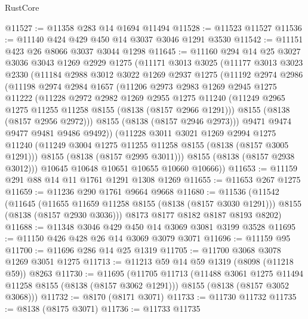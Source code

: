 \begin{lexlean}{RustCore}
\begin{coremodule}
@11527 := @11358 @283 @14 @1694 @11494
@11528 := @11523 @11527
@11536 := @11140 @424 @429 @450 @14 @3037 @3046 @1291 @3530
@11542 := @11151 @423 @26 @8066 @3037 @3044 @1298
@11645 := @11160
    @294
    @14
    @25
    @3027
    @3036
    @3043
    @1269
    @2929
    @1275
    (@11171
      @3013
      @3025
      (@11177
        @3013
        @3023
        @2330
        (@11184
          @2988
          @3012
          @3022
          @1269
          @2937
          @1275
          (@11192
            @2974
            @2986
            (@11198
              @2974
              @2984
              @1657
              (@11206
                @2973
                @2983
                @1269
                @2945
                @1275
                @11222
                (@11228
                  @2972
                  @2982
                  @1269
                  @2955
                  @1275
                  @11240
                  (@11249 @2965 @1275 @11255 @11258 @8155 (@8138 (@8157 @2966 @1291)))
                  @8155
                  (@8138 (@8157 @2956 @2972)))
                @8155
                (@8138 (@8157 @2946 @2973)))
              @9471
              @9474
              @9477
              @9481
              @9486
              @9492))
          (@11228
            @3011
            @3021
            @1269
            @2994
            @1275
            @11240
            (@11249 @3004 @1275 @11255 @11258 @8155 (@8138 (@8157 @3005 @1291)))
            @8155
            (@8138 (@8157 @2995 @3011)))
          @8155
          (@8138 (@8157 @2938 @3012)))
        @10645
        @10648
        @10651
        @10655
        @10660
        @10666))
@11653 := @11159 @291 @88 @14 @11 @1761 @1291 @1308 @1269
@11655 := @11653 @267 @1275
@11659 := @11236 @290 @1761 @9664 @9668
@11680 := @11536
    (@11542
      (@11645
        (@11655 @11659 @11258 @8155 (@8138 (@8157 @3030 @1291)))
        @8155
        (@8138 (@8157 @2930 @3036)))
      @8173
      @8177
      @8182
      @8187
      @8193
      @8202)
@11688 := @11348 @3046 @429 @450 @14 @3069 @3081 @3199 @3528
@11695 := @11150 @426 @428 @26 @14 @3069 @3079 @3071
@11696 := @11159 @95
@11700 := @11696 @286 @14 @25 @1319
@11705 := @11700 @3068 @3078 @1269 @3051 @1275
@11713 := @11213 @59 @14 @59 @1319 (@8098 (@11218 @59)) @8263
@11730 := @11695
    (@11705
      @11713
      (@11488 @3061 @1275 @11494 @11258 @8155 (@8138 (@8157 @3062 @1291)))
      @8155
      (@8138 (@8157 @3052 @3068)))
@11732 := @8170 (@8171 @3071)
@11733 := @11730 @11732
@11735 := @8138 (@8175 @3071)
@11736 := @11733 @11735

\end{coremodule}
\end{lexlean}
